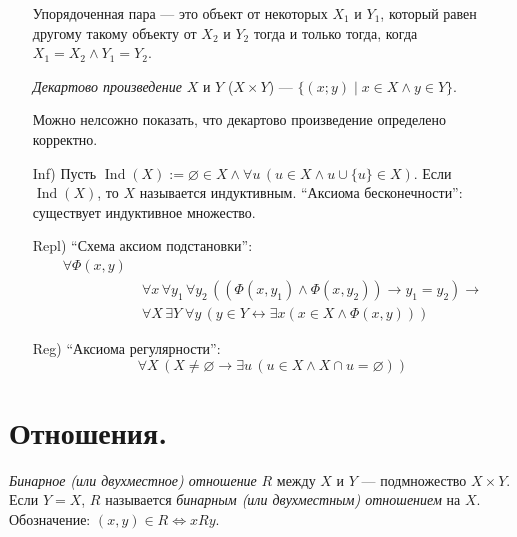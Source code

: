 \documentclass[12pt,a4paper]{article}
\DeclareMathOperator{\Ind}{Ind}
\begin{document}
\begin{definition}[аксиомы ZFC (= ZF (аксиомы Цермело-Френкеля) + C (аксиома выбора))]
\begin{itemize}
                \begin{definition}
                    Упорядоченная пара --- это объект от некоторых $X_1$ и $Y_1$, который равен другому такому объекту от $X_2$ и $Y_2$ тогда и только тогда, когда $X_1 = X_2 \wedge Y_1 = Y_2$.
                \end{definition}

                \begin{definition}
                    \emph{Декартово произведение} $X$ и $Y$ ($X \times Y$) --- $\{(x; y) \mid x \in X \wedge y \in Y\}$. 
                \end{definition}

                \begin{remark}
                    Можно нелсожно показать, что декартово произведение определено корректно.
                \end{remark}
            \item[Inf)] Пусть $\Ind(X) := \varnothing \in X \wedge \forall u\, (u \in X \wedge u \cup \{u\} \in X)$. Если $\Ind(X)$, то $X$ называется индуктивным. ``Аксиома бесконечности'': существует индуктивное множество.
            \item[Repl)] ``Схема аксиом подстановки'':
                \begin{align*}
                    \forall \Phi(x, y)\;&\\
                    &\forall x\, \forall y_1\, \forall y_2\, ((\Phi(x, y_1) \wedge \Phi(x, y_2)) \rightarrow y_1 = y_2) \rightarrow\\
                    &\forall X\, \exists Y\; \forall y\, (y \in Y \leftrightarrow \exists x (x \in X \wedge \Phi(x, y)))
                \end{align*}
            \item[Reg)] ``Аксиома регулярности'':
                \[
                    \forall X\, (X\neq \varnothing \rightarrow \exists u\, (u\in X \wedge X \cap u = \varnothing))
                \]
        \end{itemize}
    \end{definition}

    \section{Отношения.}

    \begin{definition}
        \emph{Бинарное (или двухместное) отношение} $R$ между $X$ и $Y$ --- подмножество $X \times Y$. Если $Y = X$, $R$ называется \emph{бинарным (или двухместным) отношением} на $X$.\\
        Обозначение: $(x, y) \in R \Leftrightarrow xRy$.
    \end{definition}
\end{document}
